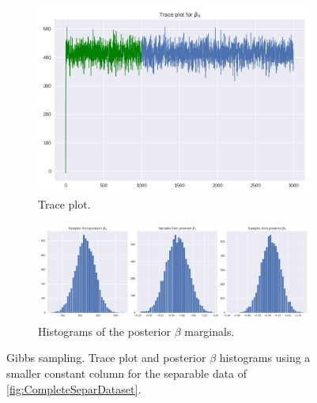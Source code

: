 \documentclass[11pt]{article}
\begin{document}
\begin{figure}
	\centering
	\begin{subfigure}[t]{.66\linewidth}
	\includegraphics[width=\linewidth]{images/separable_smallbias_trace.png}
	\caption{Trace plot.}
	\end{subfigure}
	\begin{subfigure}[t]{.66\linewidth}
	\includegraphics[width=\linewidth]{images/separable_smallbias_posteriorhist.png}
	\caption{Histograms of the posterior $\beta$ marginals.}
	\end{subfigure}
	\caption{Gibbs sampling. Trace plot and posterior $\beta$ histograms using a smaller constant column for the separable data of \cref{fig:CompleteSeparDataset}.}\label{fig:CompleteSeparSmallBiasFix}
\end{figure}
\end{document}
